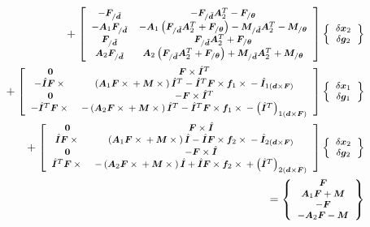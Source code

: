 \documentclass[10pt,dvips,fleqn,subeqn]{report}
\newcommand{\T}[1]{\bm{#1}}
\newcommand{\TT}[1]{\bm{#1}}
\begin{document}
\begin{align}
	\footnotesize
	\mbox{} + \sqbr{\matr{cc}{
		- \T{F}_{/\tilde{\T{d}}}
		& - \T{F}_{/\tilde{\T{d}}} \TT{A}_2^T
			- \T{F}_{/\T{\theta}}
		\\
%
		- \TT{A}_1 \T{F}_{/\tilde{\T{d}}}
		& - \TT{A}_1 \plbr{
			\T{F}_{/\tilde{\T{d}}} \TT{A}_2^T
			+ \T{F}_{/\T{\theta}}
		}
		- \T{M}_{/\tilde{\T{d}}} \TT{A}_2^T
			- \T{M}_{/\T{\theta}}
		\\
%
		\T{F}_{/\tilde{\T{d}}}
		& \T{F}_{/\tilde{\T{d}}} \TT{A}_2^T
			+ \T{F}_{/\T{\theta}}
		\\
%
		\TT{A}_2 \T{F}_{/\tilde{\T{d}}}
		& \TT{A}_2 \plbr{
			\T{F}_{/\tilde{\T{d}}} \TT{A}_2^T
			+ \T{F}_{/\T{\theta}}
		}
		+ \T{M}_{/\tilde{\T{d}}} \TT{A}_2^T
			+ \T{M}_{/\T{\theta}}
	}} \cubr{\cvvect{
		\delta\T{x}_2 \\
		\delta\T{g}_2
	}} & \nonumber \\
	\footnotesize
	\mbox{} + \sqbr{\matr{cc}{
		\T{0} & \T{F}\times\hat{\T{I}}^T
		\\
%
		- \hat{\TT{I}}\T{F}\times{}
		& \plbr{
			\TT{A}_1 \T{F}\times{}
			+ \T{M}\times{}
		} \hat{\TT{I}}^T
			- \hat{\TT{I}}^T \T{F}\times\T{f}_1\times{}
			- \hat{\TT{I}}_{1\plbr{\T{d}\times\T{F}}}
		\\
%
		\T{0} & - \T{F}\times\hat{\T{I}}^T
		\\
%
		- \hat{\TT{I}}^T\T{F}\times{}
		&  - \plbr{
			\TT{A}_2 \T{F}\times{}
			+ \T{M}\times{}
		} \hat{\TT{I}}^T
			- \hat{\TT{I}}^T \T{F}\times\T{f}_1\times{}
			- \plbr{\hat{\TT{I}}^T}_{1\plbr{\T{d}\times\T{F}}}
	}} \cubr{\cvvect{
		\delta\T{x}_1 \\
		\delta\T{g}_1
	}} & \nonumber \\
	\footnotesize
	\mbox{} + \sqbr{\matr{cc}{
		\T{0} & \T{F}\times\hat{\T{I}}
		\\
%
		\hat{\TT{I}}\T{F}\times{}
		& \plbr{
			\TT{A}_1 \T{F}\times{}
			+ \T{M}\times{}
		} \hat{\TT{I}}
			- \hat{\TT{I}} \T{F}\times\T{f}_2\times{}
			- \hat{\TT{I}}_{2\plbr{\T{d}\times\T{F}}}
		\\
%
		\T{0} & - \T{F}\times\hat{\T{I}}
		\\
%
		\hat{\TT{I}}^T\T{F}\times{}
		& - \plbr{
			\TT{A}_2 \T{F}\times{}
			+ \T{M}\times{}
		} \hat{\TT{I}}
			+ \hat{\TT{I}} \T{F}\times\T{f}_2\times{}
			+ \plbr{\hat{\TT{I}}^T}_{2\plbr{\T{d}\times\T{F}}}
	}} \cubr{\cvvect{
		\delta\T{x}_2 \\
		\delta\T{g}_2
	}}
	& \nonumber \\
	\footnotesize \mbox{}
	= \cubr{\cvvect{
		\T{F} \\
		\TT{A}_1 \T{F} + \T{M} \\
		- \T{F} \\
		- \TT{A}_2 \T{F} - \T{M}
	}} &
\end{align}
\end{document}
